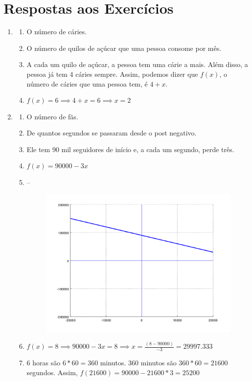 \documentclass[12pt]{article}
\begin{document}
\section{Respostas aos Exercícios}
\begin{enumerate}
	\item 
	\begin{enumerate}
		\item O número de cáries.
		\item O número de quilos de açúcar que uma pessoa consome por mês.
		\item A cada um quilo de açúcar, a pessoa tem uma cárie a mais. Além
			disso, a pessoa já tem 4 cáries sempre. Assim, podemos dizer que 
			$f(x)$, o número de cáries que uma pessoa tem, é $4 + x$.
		\item $f(x) = 6 \implies 4 + x = 6 \implies x = 2$
	\end{enumerate}

	\item 
	\begin{enumerate}
		\item O número de fãs.
		\item De quantos segundos se passaram desde o post negativo.
		\item Ele tem 90 mil seguidores de início e, a cada um segundo, 
			perde três.
		\item $f(x) = 90000 - 3x$
		\item --
			\begin{figure}[H]
				\centering
				\includegraphics[width=0.8\linewidth]{imgs/exc2chart.png}
			\end{figure}
		\item $f(x) = 8 \implies 90000 - 3x = 8 \implies x = 
			\frac{(8 - 90000)}{-3} = 29997.333$
		\item 6 horas são $6*60 = 360$ minutos. 360 minutos são 
		$360*60 = 21600$ segundos. Assim, $f(21600) = 90000 - 21600*3 =
		25200$
	\end{enumerate}


\end{enumerate}
\end{document}

